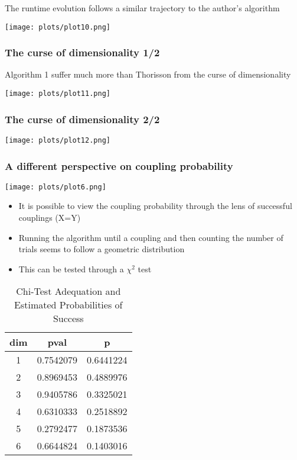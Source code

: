 \documentclass{beamer}
\begin{document}
\begin{frame}
The runtime evolution follows a similar trajectory to the author's algorithm
\begin{center}
\texttt{[image: plots/plot10.png]}
\end{center}
\end{frame}

\begin{frame}
\frametitle{The curse of dimensionality 1/2}
Algorithm 1 suffer much more than Thorisson from the curse of dimensionality
\begin{center}
\texttt{[image: plots/plot11.png]}
\end{center}
\end{frame}
\begin{frame}
\frametitle{The curse of dimensionality 2/2}
\begin{center}
\texttt{[image: plots/plot12.png]}
\end{center}
\end{frame}
\begin{frame}
\frametitle{A different perspective on coupling probability}
\begin{center}
\texttt{[image: plots/plot6.png]}
\end{center}
\end{frame}
\begin{frame}
\begin{itemize}
\item It is possible to view the coupling probability through the lens of successful couplings (X=Y)
\item Running the algorithm until a coupling and then counting the number of trials seems to follow a geometric distribution
\item This can be tested through a $\chi^2$ test
\end{itemize}
\begin{table}
\centering
\caption{Chi-Test Adequation and Estimated Probabilities of Success}
\begin{tabular}{ccc}
\hline
\textbf{dim} & \textbf{pval} & \textbf{p} \\
\hline
1 & 0.7542079 & 0.6441224 \\
2 & 0.8969453 & 0.4889976 \\
3 & 0.9405786 & 0.3325021 \\
4 & 0.6310333 & 0.2518892 \\
5 & 0.2792477 & 0.1873536 \\
6 & 0.6644824 & 0.1403016 \\
\hline
\end{tabular}
\end{table}
\end{frame}
\end{document}
